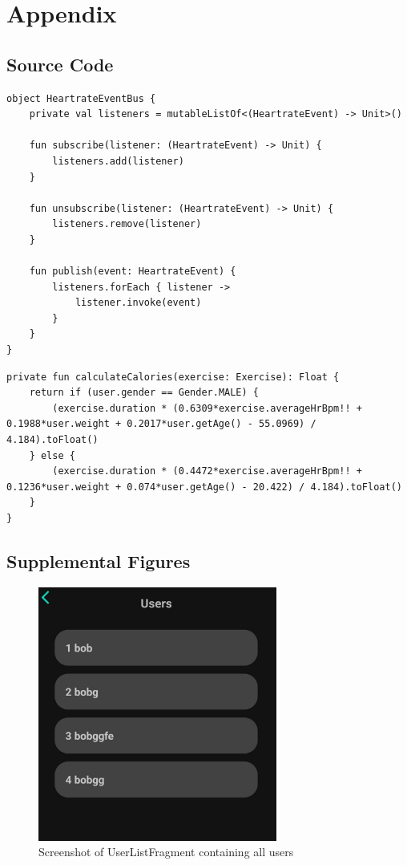 \appendix


\chapter{Appendix}


\section{Source Code}
\begin{lstlisting}[caption={Implementation of EventBus (Kotlin - HeartrateEventBus)}]
object HeartrateEventBus {
    private val listeners = mutableListOf<(HeartrateEvent) -> Unit>()

    fun subscribe(listener: (HeartrateEvent) -> Unit) {
        listeners.add(listener)
    }

    fun unsubscribe(listener: (HeartrateEvent) -> Unit) {
        listeners.remove(listener)
    }

    fun publish(event: HeartrateEvent) {
        listeners.forEach { listener ->
            listener.invoke(event)
        }
    }
}
\end{lstlisting}

\begin{lstlisting}[caption={Implementation of calorie calculation (Kotlin - ExerciseService)}]
private fun calculateCalories(exercise: Exercise): Float {
    return if (user.gender == Gender.MALE) {
        (exercise.duration * (0.6309*exercise.averageHrBpm!! + 0.1988*user.weight + 0.2017*user.getAge() - 55.0969) / 4.184).toFloat()
    } else {
        (exercise.duration * (0.4472*exercise.averageHrBpm!! + 0.1236*user.weight + 0.074*user.getAge() - 20.422) / 4.184).toFloat()
    }
}
\end{lstlisting}

\section{Supplemental Figures}
\begin{figure}[H]
    \centering
    \includegraphics[width=0.7\textwidth]{images/userlistfragment-screenshot.jpeg}
    \caption{Screenshot of UserListFragment containing all users}
    \label{fig:userlistfragment}
\end{figure}

